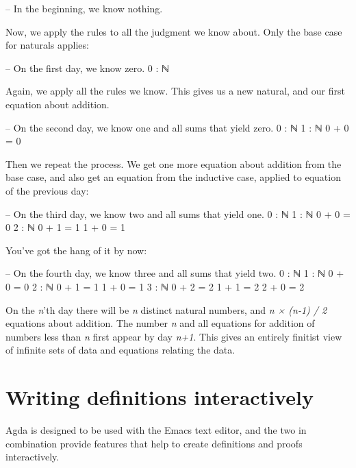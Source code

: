 \begin{myDisplay}
-- In the beginning, we know nothing.
\end{myDisplay}

Now, we apply the rules to all the judgment we know about. Only the base
case for naturals applies:

\begin{myDisplay}
-- On the first day, we know zero.
0 : ℕ
\end{myDisplay}

Again, we apply all the rules we know. This gives us a new natural, and
our first equation about addition.

\begin{myDisplay}
-- On the second day, we know one and all sums that yield zero.
0 : ℕ
1 : ℕ    0 + 0 = 0
\end{myDisplay}

Then we repeat the process. We get one more equation about addition from
the base case, and also get an equation from the inductive case, applied
to equation of the previous day:

\begin{myDisplay}
-- On the third day, we know two and all sums that yield one.
0 : ℕ
1 : ℕ    0 + 0 = 0
2 : ℕ    0 + 1 = 1   1 + 0 = 1
\end{myDisplay}

You've got the hang of it by now:

\begin{myDisplay}
-- On the fourth day, we know three and all sums that yield two.
0 : ℕ
1 : ℕ    0 + 0 = 0
2 : ℕ    0 + 1 = 1   1 + 0 = 1
3 : ℕ    0 + 2 = 2   1 + 1 = 2    2 + 0 = 2
\end{myDisplay}

On the \emph{n}'th day there will be \emph{n} distinct natural numbers,
and \emph{n × (n-1) / 2} equations about addition. The number \emph{n}
and all equations for addition of numbers less than \emph{n} first
appear by day \emph{n+1}. This gives an entirely finitist view of
infinite sets of data and equations relating the data.

\hypertarget{writing-definitions-interactively}{%
\section{Writing definitions
interactively}\label{writing-definitions-interactively}}

Agda is designed to be used with the Emacs text editor, and the two in
combination provide features that help to create definitions and proofs
interactively.

